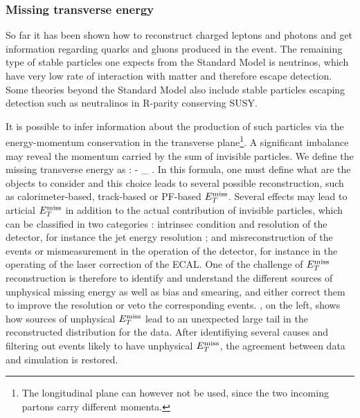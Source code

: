 
            \subsubsection{Missing transverse energy}

        So far it has been shown how to reconstruct charged leptons and photons and get
        information regarding quarks and gluons produced in the event. The remaining
        type of stable particles one expects from the Standard Model is neutrinos, which
        have very low rate of interaction with matter and therefore escape detection. Some
        theories beyond the Standard Model also include stable particles escaping detection
        such as neutralinos in R-parity conserving SUSY.

        It is possible to infer information about the production
        of such particles via the energy-momentum conservation in the transverse plane\footnote{The
        longitudinal plane can however not be used, since the two incoming partons carry
        different momenta.}. A significant imbalance may reveal the momentum carried by
        the sum of invisible particles. We define the missing transverse energy as :
        {
            \MET {} - \sum_{} \vec{\pT}.
        }
        In this formula, one must define what are the objects to consider and this choice
        leads to several possible reconstruction, such as calorimeter-based, track-based
        or PF-based $E_T^\text{miss}$. Several effects may lead to articial $E_T^\text{miss}$ in addition to the
        actual contribution of invisible particles, which can be classified in two categories :
        intrinsec condition and resolution of the detector, for instance the jet energy
        resolution ; and misreconstruction of the events or mismeasurement in the
        operation of the detector, for instance in the operating of the laser correction
        of the ECAL. One of the challenge of $E_T^\text{miss}$ reconstruction is therefore to identify
        and understand the different sources of unphysical missing energy as well as bias and
        smearing, and either correct them to improve the resolution or veto the corresponding
        events.
        , on the left, shows how sources of unphysical $E_T^\text{miss}$
        lead to an unexpected large tail in the reconstructed distribution for the data.
        After identifiying several causes and filtering out events likely to have unphysical
        $E_T^\text{miss}$, the agreement between data and simulation is restored.

